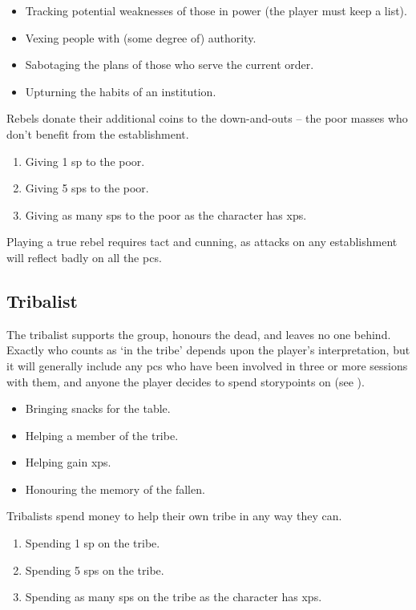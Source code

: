 \begin{multicols}{2}
\begin{itemize}
  \item
  Tracking potential weaknesses of those in power (the player must keep a list).
  \item
  Vexing people with (some degree of) authority.
  \item
  Sabotaging the plans of those who serve the current order.
  \item
  Upturning the habits of an institution.
\end{itemize}

Rebels donate their additional \glspl{coin} to the down-and-outs -- the poor masses who don't benefit from the establishment.

\begin{enumerate}
  \item
  Giving 1 \gls{sp} to the poor.
  \item
  Giving 5 \glspl{sp} to the poor.
  \item
  Giving as many \glspl{sp} to the poor as the character has \glspl{xp}.
\end{enumerate}

Playing a true rebel requires tact and cunning, as attacks on any establishment will reflect badly on all the \glspl{pc}.

\subsection{Tribalist}
\label{tribalist}

The tribalist supports the group, honours the dead, and leaves no one behind.
Exactly who counts as `in the tribe' depends upon the player's interpretation, but it will generally include any \glspl{pc} who have been involved in three or more sessions with them, and anyone the player decides to spend \glspl{storypoint} on (see ).

\begin{itemize}
  \item
  Bringing snacks for the table.
  \item
  Helping a member of the tribe.
  \item
  Helping  gain \glspl{xp}.
  \item
  Honouring the memory of the fallen.
\end{itemize}

Tribalists spend money to help their own tribe in any way they can.

\begin{enumerate}
  \item
  Spending 1 \gls{sp} on the tribe.
  \item
  Spending 5 \glspl{sp} on the tribe.
  \item
  Spending as many \glspl{sp} on the tribe as the character has \glspl{xp}.
\end{enumerate}


\end{multicols}
